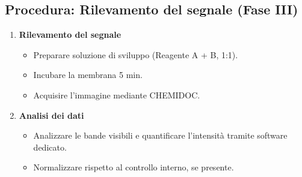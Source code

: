 \subsection{Procedura: Rilevamento del segnale (Fase III)}
\begin{enumerate}  
  \item \textbf{Rilevamento del segnale}
    \begin{itemize}
      \item Preparare soluzione di sviluppo (Reagente A + B, 1:1).
      \item Incubare la membrana 5 min.
      \item Acquisire l'immagine mediante CHEMIDOC.
    \end{itemize}
  
  \item \textbf{Analisi dei dati}
    \begin{itemize}
      \item Analizzare le bande visibili e quantificare l’intensità tramite software dedicato.
      \item Normalizzare rispetto al controllo interno, se presente.
    \end{itemize}
\end{enumerate}
\newpage